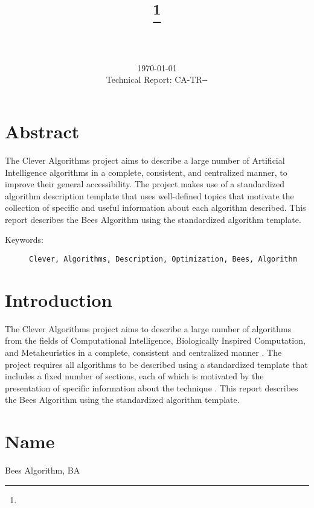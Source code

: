 \documentclass[a4paper, 11pt]{article}
\title{{\myreporttitle}\footnote{\myreportlicense}}
\author{\myreportauthor\\{\myreportemail}\\\small\myreportproject}
\date{\today\\{\small{Technical Report: CA-TR-{\myreportdate}-\myreportversion}}}
\begin{document}
\maketitle

\section*{Abstract}
The Clever Algorithms project aims to describe a large number of Artificial Intelligence algorithms in a complete, consistent, and centralized manner, to improve their general accessibility. 
The project makes use of a standardized algorithm description template that uses well-defined topics that motivate the collection of specific and useful information about each algorithm described.
This report describes the Bees Algorithm using the standardized algorithm template.

\begin{description}
	\item[Keywords:] {\small\texttt{Clever, Algorithms, Description, Optimization, Bees, Algorithm}}
\end{description} 

\section{Introduction} 
\label{sec:intro}
The Clever Algorithms project aims to describe a large number of algorithms from the fields of Computational Intelligence, Biologically Inspired Computation, and Metaheuristics in a complete, consistent and centralized manner \cite{Brownlee2010}.
The project requires all algorithms to be described using a standardized template that includes a fixed number of sections, each of which is motivated by the presentation of specific information about the technique \cite{Brownlee2010a}.
This report describes the Bees Algorithm using the standardized algorithm template.

\section{Name} 
\label{sec:name}
Bees Algorithm, BA
\end{document}
